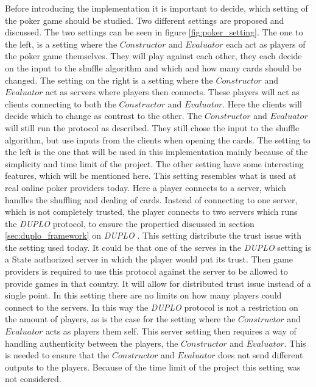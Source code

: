\documentclass[twoside,11pt,openright]{report}
\newcommand{\DUPLO}{\textit{DUPLO} }
\begin{document}
Before introducing the implementation it is important to decide, which setting of the poker game should be studied. Two different settings are proposed and discussed. The two settings can be seen in figure \ref{fig:poker_setting}. The one to the left, is a setting where the $Constructor$ and $Evaluator$ each act as players of the poker game themselves. They will play against each other, they each decide on the input to the shuffle algorithm and which and how many cards should be changed. The setting on the right is a setting where the $Constructor$ and $Evaluator$ act as servers where players then connects. These players will act as clients connecting to both the $Constructor$ and $Evaluator$. Here the clients will decide which to change as contrast to the other. The $Constructor$ and $Evaluator$ will still run the protocol as described. They still chose the input to the shuffle algorithm, but use inputs from the clients when opening the cards. The setting to the left is the one that will be used in this implementation mainly because of the simplicity and time limit of the project. The other setting have some interesting features, which will be mentioned here. This setting resembles what is used at real online poker providers today. Here a player connects to a server, which handles the shuffling and dealing of cards. Instead of connecting to one server, which is not completely trusted, the player connects to two servers which runs the \DUPLO protocol, to ensure the propertied discussed in section \ref{sec:duplo_framework} on \DUPLO. This setting distribute the trust issue with the setting used today. It could be that one of the serves in the \DUPLO setting is a State authorized server in which the player would put its trust. Then game providers is required to use this protocol against the server to be allowed to provide games in that country. It will allow for distributed trust issue instead of a single point. In this setting there are no limits on how many players could connect to the servers. In this way the \DUPLO protocol is not a restriction on the amount of players, as is the case for the setting where the $Constructor$ and $Evaluator$ acts as players them self. This server setting then requires a way of handling authenticity between the players, the $Constructor$ and $Evaluator$. This is needed to ensure that the $Constructor$ and $Evaluator$ does not send different outputs to the players. Because of the time limit of the project this setting was not considered.

\bigskip
\end{document}
